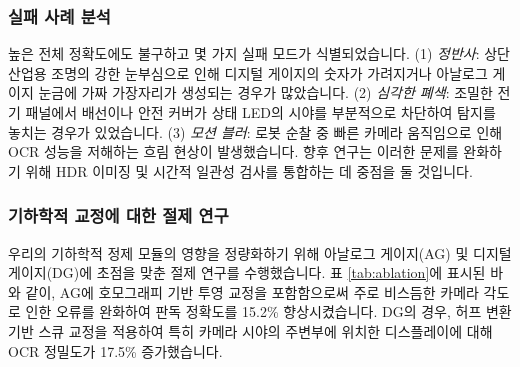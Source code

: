 \subsubsection{실패 사례 분석}
높은 전체 정확도에도 불구하고 몇 가지 실패 모드가 식별되었습니다.
(1) \textit{정반사}: 상단 산업용 조명의 강한 눈부심으로 인해 디지털 게이지의 숫자가 가려지거나 아날로그 게이지 눈금에 가짜 가장자리가 생성되는 경우가 많았습니다.
(2) \textit{심각한 폐색}: 조밀한 전기 패널에서 배선이나 안전 커버가 상태 LED의 시야를 부분적으로 차단하여 탐지를 놓치는 경우가 있었습니다.
(3) \textit{모션 블러}: 로봇 순찰 중 빠른 카메라 움직임으로 인해 OCR 성능을 저해하는 흐림 현상이 발생했습니다.
향후 연구는 이러한 문제를 완화하기 위해 HDR 이미징 및 시간적 일관성 검사를 통합하는 데 중점을 둘 것입니다.

\subsubsection{기하학적 교정에 대한 절제 연구}
우리의 기하학적 정제 모듈의 영향을 정량화하기 위해 아날로그 게이지(AG) 및 디지털 게이지(DG)에 초점을 맞춘 절제 연구를 수행했습니다.
표 \ref{tab:ablation}에 표시된 바와 같이, AG에 호모그래피 기반 투영 교정을 포함함으로써 주로 비스듬한 카메라 각도로 인한 오류를 완화하여 판독 정확도를 15.2\% 향상시켰습니다.
DG의 경우, 허프 변환 기반 스큐 교정을 적용하여 특히 카메라 시야의 주변부에 위치한 디스플레이에 대해 OCR 정밀도가 17.5\% 증가했습니다.

